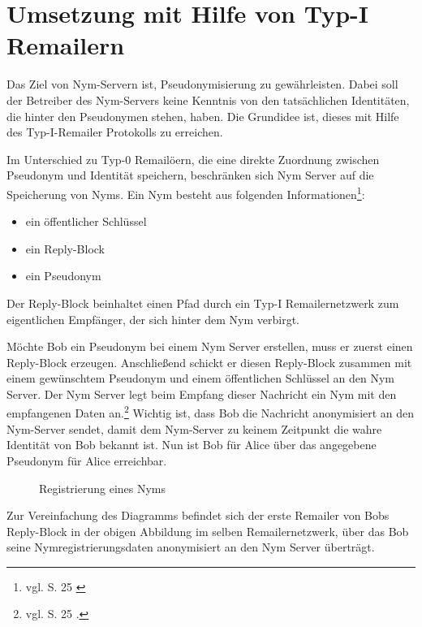 \section{Umsetzung mit Hilfe von Typ-I Remailern}
Das Ziel von Nym-Servern ist, Pseudonymisierung zu gewährleisten. Dabei soll der Betreiber des Nym-Servers keine Kenntnis von den tatsächlichen Identitäten, die hinter den Pseudonymen stehen, haben. Die Grundidee ist, dieses mit Hilfe des Typ-I-Remailer Protokolls zu erreichen.

Im Unterschied zu Typ-0 Remailöern, die eine direkte Zuordnung zwischen Pseudonym und Identität speichern, beschränken sich Nym Server auf die Speicherung von Nyms.
Ein Nym besteht aus folgenden Informationen\footnote{vgl. S. 25 \cite{loesing2009privacy}}:
\begin{itemize}
\item ein öffentlicher Schlüssel
\item ein Reply-Block
\item ein Pseudonym
\end{itemize}

Der Reply-Block beinhaltet einen Pfad durch ein Typ-I Remailernetzwerk zum eigentlichen Empfänger, der sich hinter dem Nym verbirgt.

Möchte Bob ein Pseudonym bei einem Nym Server erstellen, muss er zuerst einen Reply-Block erzeugen. Anschließend schickt er diesen Reply-Block zusammen mit einem gewünschtem Pseudonym und einem öffentlichen Schlüssel an den Nym Server. Der Nym Server legt beim Empfang dieser Nachricht ein Nym mit den empfangenen Daten an.\footnote{vgl. S. 25 \cite{loesing2009privacy}.} Wichtig ist, dass Bob die Nachricht anonymisiert an den Nym-Server sendet, damit dem Nym-Server zu keinem Zeitpunkt die wahre Identität von Bob bekannt ist. Nun ist Bob für Alice über das angegebene Pseudonym für Alice erreichbar.

\begin{figure}
	\centering
	\begin{sequencediagram}
	\end{sequencediagram}
	\caption{Registrierung eines Nyms}
\end{figure}

Zur Vereinfachung des Diagramms befindet sich der erste Remailer von Bobs Reply-Block in der obigen Abbildung im selben Remailernetzwerk, über das Bob seine Nymregistrierungsdaten anonymisiert an den Nym Server überträgt.

